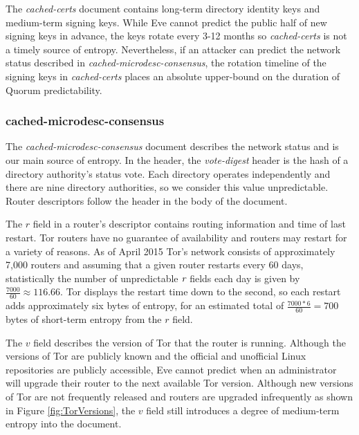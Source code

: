 The \emph{cached-certs} document contains long-term directory identity keys and medium-term signing keys. While Eve cannot predict the public half of new signing keys in advance, the keys rotate every 3-12 months\cite{TorDirSpec} so \emph{cached-certs} is not a timely source of entropy. Nevertheless, if an attacker can predict the network status described in \emph{cached-microdesc-consensus}, the rotation timeline of the signing keys in \emph{cached-certs} places an absolute upper-bound on the duration of Quorum predictability.

\subsubsection{cached-microdesc-consensus}

The \emph{cached-microdesc-consensus} document describes the network status and is our main source of entropy. In the header, the  \emph{vote-digest} header is the hash of a directory authority's status vote. Each directory operates independently and there are nine directory authorities, so we consider this value unpredictable. Router descriptors follow the header in the body of the document. 

The $ r $ field in a router's descriptor contains routing information and time of last restart. Tor routers have no guarantee of availability and routers may restart for a variety of reasons. As of April 2015 Tor's network consists of approximately 7,000 routers \cite{TorMetrics} and assuming that a given router restarts every 60 days, statistically the number of unpredictable $ \emph{r} $ fields each day is given by $ \frac{7000}{60} \approx 116.66 $. Tor displays the restart time down to the second, so each restart adds approximately six bytes of entropy, for an estimated total of $ \frac{7000 * 6}{60} = 700 $ bytes of short-term entropy from the $ r $ field.


The $ v $ field describes the version of Tor that the router is running. Although the versions of Tor are publicly known and the official and unofficial Linux repositories are publicly accessible, Eve cannot predict when an administrator will upgrade their router to the next available Tor version. Although new versions of Tor are not frequently released and routers are upgraded infrequently as shown in Figure \ref{fig:TorVersions}, the $ v $ field still introduces a degree of medium-term entropy into the document.

